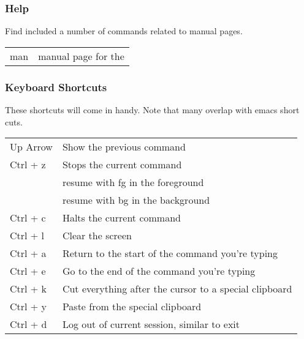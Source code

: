 \subsubsection{Help}
\label{\detokenize{lesson/linux/linux:help}}
Find included a number of commands related to manual pages.

\noindent\begin{tabulary}{\linewidth}{|L|L|}
\hline
{}\relax &\relax \\
\hline
man 
&
manual page for the 
\\
\hline\end{tabulary}



\subsubsection{Keyboard Shortcuts}
\label{\detokenize{lesson/linux/linux:keyboard-shortcuts}}
These shortcuts will come in handy. Note that many overlap with emacs
short cuts.

\noindent\begin{tabulary}{\linewidth}{|L|L|}
\hline
{}\relax &\relax \\
\hline
Up Arrow
&
Show the previous command
\\
\hline
Ctrl + z
&
Stops the current command
\\
\hline&
resume with fg in the foreground
\\
\hline&
resume with bg in the background
\\
\hline
Ctrl + c
&
Halts the current command
\\
\hline
Ctrl + l
&
Clear the screen
\\
\hline
Ctrl + a
&
Return to the start of the command you're typing
\\
\hline
Ctrl + e
&
Go to the end of the command you're typing
\\
\hline
Ctrl + k
&
Cut everything after the cursor to a special clipboard
\\
\hline
Ctrl + y
&
Paste from the special clipboard
\\
\hline
Ctrl + d
&
Log out of current session, similar to exit
\\
\hline\end{tabulary}



